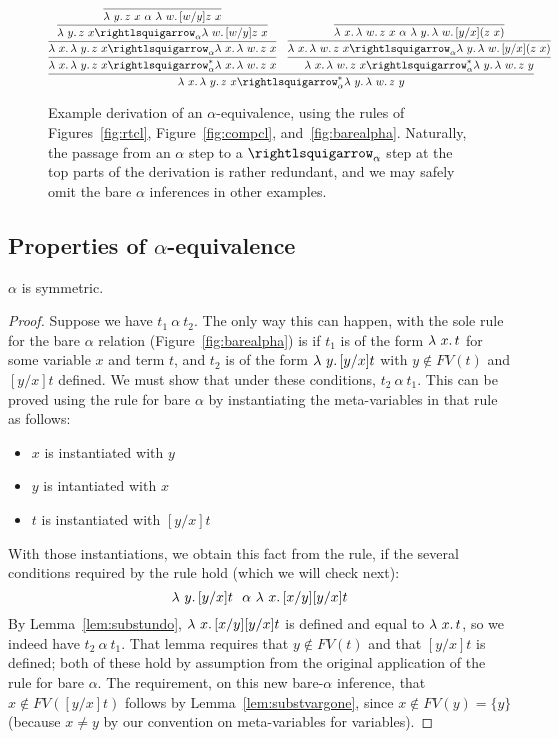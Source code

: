 \begin{figure}
  \[
  \infer{\lam{x}{\lam{y}{z\ x}} \curva_\alpha^* \lam{y}{\lam{w}{z\ y}}}
    {\infer{\lam{x}{\lam{y}{z\ x}} \curva_\alpha^* \lam{x}{\lam{w}{z\ x}}}
        {\infer{\lam{x}{\lam{y}{z\ x}} \curva_\alpha \lam{x}{\lam{w}{z\ x}}}
          {\infer{\lam{y}{z\ x} \curva_\alpha \lam{w}{[w/y]z\ x}}{\infer{\lam{y}{z\ x} \ \alpha\  \lam{w}{[w/y]z\ x}}{\ } }}} & 
        \infer{\lam{x}{\lam{w}{z\ x}} \curva_\alpha^* \lam{y}{\lam{w}{z\ y}}}
              {\infer{\lam{x}{\lam{w}{z\ x}} \curva_\alpha \lam{y}{\lam{w}{[y/x](z\ x)}}}{\infer{\lam{x}{\lam{w}{z\ x}} \ \alpha\  \lam{y}{\lam{w}{[y/x](z\ x)}}}{\ } }}}
    \]
\caption{Example derivation of an $\alpha$-equivalence, using the rules of Figures~\ref{fig:rtcl}, Figure~\ref{fig:compcl}, and~\ref{fig:barealpha}. Naturally, the passage from an $\alpha$ step to a $\curva_\alpha$ step at the top parts of the derivation is rather redundant, and we may safely omit the bare $\alpha$ inferences in other examples.} 
\label{fig:alphaexa}
\end{figure}

\subsection{Properties of $\alpha$-equivalence}

\begin{lemma}
\label{lem:alphasymm}
  $\alpha$ is symmetric.
\end{lemma}
\begin{proof} Suppose we have $t_1\ \alpha\ t_2$.  The only way this can happen,
  with the sole rule for the bare $\alpha$ relation (Figure~\ref{fig:barealpha})
  is if $t_1$ is of the form $\lambda\ x.\, t$ for some variable $x$ and term $t$, and $t_2$
  is of the form $\lambda\ y.\, [y/x]t$ with $y\not\in\textit{FV}(t)$ and $[y/x]t$ defined.
  We must show that under these conditions, $t_2\ \alpha\ t_1$.  This can be proved
  using the rule for bare $\alpha$ by instantiating the meta-variables in that rule
  as follows:
  \begin{itemize}
  \item $x$ is instantiated with $y$
  \item $y$ is intantiated with $x$
  \item $t$ is instantiated with $[y/x]t$
  \end{itemize}
  \noindent With those instantiations, we obtain this fact from the rule, if the
  several conditions required by the rule hold (which we will check next):
  \[
  \lam{y}{[y/x]t}\ \ \alpha\ \lam{x}{[x/y][y/x]t}
  \]
  \noindent By Lemma~\ref{lem:substundo}, $\lambda\ x.\, [x/y][y/x]t$ is defined and equal to $\lambda\ x.\, t$,
  so we indeed have $t_2\ \alpha\ t_1$.  That lemma requires that $y\not\in\textit{FV}(t)$ and that $[y/x]t$ is defined; both
  of these hold by assumption from the original application of the rule for bare $\alpha$.  The requirement, on this
  new bare-$\alpha$ inference, that $x\not\in\textit{FV}([y/x]t)$ follows
  by Lemma~\ref{lem:substvargone}, since $x\not\in\textit{FV}(y) = \{y\}$ (because $x\neq y$
  by our convention on meta-variables for variables).

  \end{proof}


